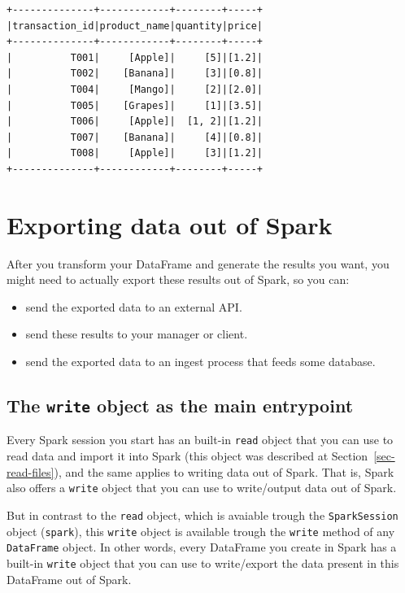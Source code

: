 \documentclass[
  11pt,
  letterpaper,
  DIV=11,
  numbers=noendperiod]{scrreprt}
\providecommand{\tightlist}{%
  \setlength{\itemsep}{0pt}\setlength{\parskip}{0pt}}\usepackage{longtable,booktabs,array}
\begin{document}
\begin{verbatim}
+--------------+------------+--------+-----+
|transaction_id|product_name|quantity|price|
+--------------+------------+--------+-----+
|          T001|     [Apple]|     [5]|[1.2]|
|          T002|    [Banana]|     [3]|[0.8]|
|          T004|     [Mango]|     [2]|[2.0]|
|          T005|    [Grapes]|     [1]|[3.5]|
|          T006|     [Apple]|  [1, 2]|[1.2]|
|          T007|    [Banana]|     [4]|[0.8]|
|          T008|     [Apple]|     [3]|[1.2]|
+--------------+------------+--------+-----+
\end{verbatim}


\hypertarget{sec-export}{%
\chapter{Exporting data out of Spark}\label{sec-export}}

After you transform your DataFrame and generate the results you want,
you might need to actually export these results out of Spark, so you
can:

\begin{itemize}
\tightlist
\item
  send the exported data to an external API.
\item
  send these results to your manager or client.
\item
  send the exported data to an ingest process that feeds some database.
\end{itemize}

\hypertarget{the-write-object-as-the-main-entrypoint}{%
\section{\texorpdfstring{The \texttt{write} object as the main
entrypoint}{The write object as the main entrypoint}}\label{the-write-object-as-the-main-entrypoint}}

Every Spark session you start has an built-in \texttt{read} object that
you can use to read data and import it into Spark (this object was
described at Section~\ref{sec-read-files}), and the same applies to
writing data out of Spark. That is, Spark also offers a \texttt{write}
object that you can use to write/output data out of Spark.

But in contrast to the \texttt{read} object, which is avaiable trough
the \texttt{SparkSession} object (\texttt{spark}), this \texttt{write}
object is available trough the \texttt{write} method of any
\texttt{DataFrame} object. In other words, every DataFrame you create in
Spark has a built-in \texttt{write} object that you can use to
write/export the data present in this DataFrame out of Spark.
\end{document}
